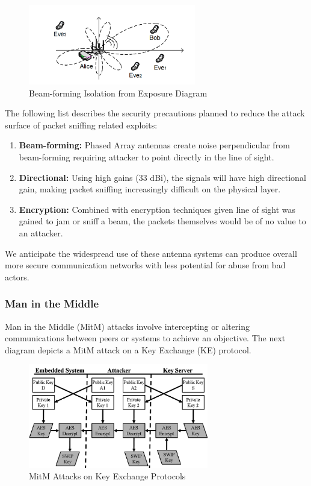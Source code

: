 \documentclass[11pt]{article}
\begin{document}
\begin{figure}[h]
    \centering
    \includegraphics[width=0.65\textwidth]{./images/rsz_beamform_isolation.png}
    \caption{Beam-forming Isolation from Exposure Diagram \cite{Beamform-ER}}
\end{figure}

\noindent The following list describes the security precautions planned to reduce the attack surface of packet sniffing related exploits:

\begin{enumerate}
    \item \textbf{Beam-forming:} Phased Array antennas create noise perpendicular from beam-forming requiring attacker to point directly in the line of sight.
    \item \textbf{Directional:} Using high gains (33 dBi), the signals will have high directional gain, making packet sniffing increasingly difficult on the physical layer.
    \item \textbf{Encryption:} Combined with encryption techniques given line of sight was gained to jam or sniff a beam, the packets themselves would be of no value to an attacker.
\end{enumerate}

\noindent We anticipate the widespread use of these antenna systems can produce overall more secure communication networks with less potential for abuse from bad actors.

\subsubsection{Man in the Middle}

Man in the Middle (MitM) attacks involve intercepting or altering communications between peers or systems to achieve an objective. The next diagram depicts a MitM attack on a Key Exchange (KE) protocol.

\begin{figure}[h]
    \centering
    \includegraphics[width=0.7\textwidth]{./images/rsz_mitm.png}
    \caption{MitM Attacks on Key Exchange Protocols \cite{MitM-attack}}
\end{figure}
\end{document}
